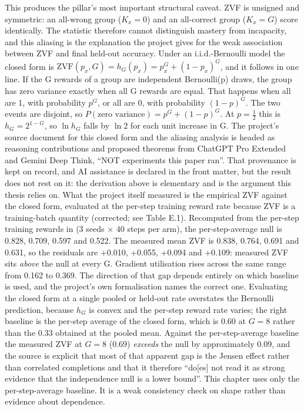\documentclass[12pt,a4paper]{report}
\newcommand{\longtok}[1]{\texttt{\seqsplit{#1}}}
\begin{document}
This produces the pillar's most important structural caveat. ZVF is
unsigned and symmetric: an all-wrong group (\(K_x = 0\)) and an
all-correct group (\(K_x = G\)) score identically. The statistic
therefore cannot distinguish mastery from incapacity, and this aliasing
is the explanation the project gives for the weak association between
ZVF and final held-out accuracy. Under an i.i.d.-Bernoulli model the
closed form is \(\mathrm{ZVF}(p_x, G) = h_G(p_x) = p_x^G + (1-p_x)^G\),
and it follows in one line. If the G rewards of a group are independent
Bernoulli(p) draws, the group has zero variance exactly when all G
rewards are equal. That happens when all are 1, with probability
\(p^G\), or all are 0, with probability \((1-p)^G\). The two events are
disjoint, so \(P(\text{zero variance}) = p^G + (1-p)^G\). At
\(p = \tfrac12\) this is \(h_G = 2^{1-G}\), so \(\ln h_G\) falls by
\(\ln 2\) for each unit increase in G. The project's source document for
this closed form and the aliasing analysis is headed as reasoning
contributions and proposed theorems from ChatGPT Pro Extended and Gemini
Deep Think, ``NOT experiments this paper ran''. That provenance is kept
on record, and AI assistance is declared in the front matter, but the
result does not rest on it: the derivation above is elementary and is
the argument this thesis relies on. What the project itself measured is
the empirical ZVF against the closed form, evaluated at the per-step
training reward rate because ZVF is a training-batch quantity
(corrected; see Table E.1). Recomputed from the per-step training
rewards in
\longtok{platform\_hybrid/experiments/results/groupsize\_\allowbreak{}zvf\_\allowbreak{}sweep.json}
(3 seeds × 40 steps per arm), the per-step-average null is 0.828, 0.709,
0.597 and 0.522. The measured mean ZVF is 0.838, 0.764, 0.691 and 0.631,
so the residuals are +0.010, +0.055, +0.094 and +0.109: measured ZVF
sits \emph{above} the null at every G. Gradient utilisation rises across
the same range from 0.162 to 0.369. The direction of that gap depends
entirely on which baseline is used, and the project's own formalisation
names the correct one. Evaluating the closed form at a single pooled or
held-out rate overstates the Bernoulli prediction, because \(h_G\) is
convex and the per-step reward rate varies; the right baseline is the
per-step average of the closed form, which is \(0.60\) at \(G = 8\)
rather than the \(0.33\) obtained at the pooled mean. Against the
per-step-average baseline the measured ZVF at \(G = 8\) (\(0.69\))
\emph{exceeds} the null by approximately \(0.09\), and the source is
explicit that most of that apparent gap is the Jensen effect rather than
correlated completions and that it therefore ``do{[}es{]} not read it as
strong evidence that the independence null is a lower bound''. This
chapter uses only the per-step-average baseline. It is a weak
consistency check on shape rather than evidence about dependence.
\end{document}
